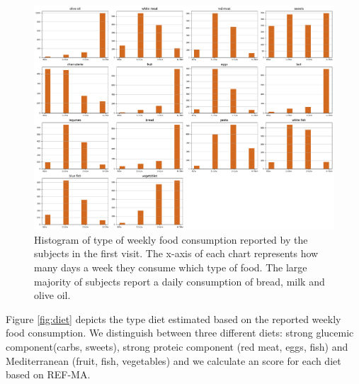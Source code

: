 \documentclass[11pt]{article}
\theoremstyle{definition}
\theoremstyle{remark}
\begin{document}
\begin{figure}[H]
        \centering
        \includegraphics[keepaspectratio, width=\linewidth]{figures/Fig_food}
        \caption{Histogram of type of weekly food consumption reported by the subjects in the first visit. The x-axis of each chart represents how many days a week they consume which type of food. The large majority of subjects report a daily consumption of bread, milk and olive oil.}
        \label{fig:food}
\end{figure}

Figure \ref{fig:diet} depicts the type diet estimated based on the reported weekly food consumption. We distinguish between three different diets: strong glucemic component(carbs, sweets), strong proteic component (red meat, eggs, fish) and Mediterranean (fruit, fish, vegetables) and we calculate an score for each diet based on REF-MA.
\end{document}
